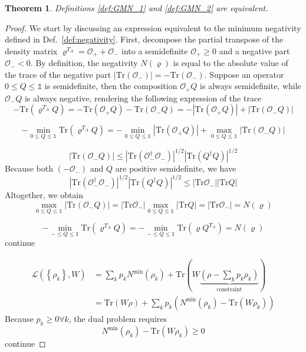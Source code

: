 \documentclass[12font]{article}
\newtheorem{theorem}{Theorem}[section]
\theoremstyle{definition}
\newcommand{\lr}[1]{\left(  #1  \right)}
\newcommand{\lrg}[1]{\left\{  #1  \right\}}
\newcommand{\abs}[1]{\left|  #1  \right|}
\newcommand{\mrm}[1]{\mathrm{#1}}
\newcommand{\alert}[1]{{\color{red}#1}}
\newcommand{\Tr}{\mrm{Tr}}
\begin{document}
\begin{theorem}
    Definitions \ref{def:GMN_1} and \ref{def:GMN_2} are equivalent.
\end{theorem}
\begin{proof}
    We start by discussing an expression equivalent to the minimum negativity defined in Def.~\ref{def:negativity}. First, decompose the partial transpose of the density matrix $\varrho^{T_A} = \mathcal{O}_+ + \mathcal{O}_-$ into a semidefinite $\mathcal{O}_+ \geq 0$ and a negative part $\mathcal{O}_- < 0$. By definition, the negativity $N(\varrho)$ is equal to the absolute value of the trace of the negative part $\abs{\Tr\lr{\mathcal{O}_-}} = -\Tr\lr{\mathcal{O}_-}$. Suppose an operator $0 \leq Q \leq \mathds{1}$ is semidefinite, then the composition $\mathcal{O}_+ Q$ is always semidefinite, while $\mathcal{O}_-Q$ is always negative, rendering the following expression of the trace
    \[
    -\Tr\lr{\varrho^{T_A} Q} 
    = 
    -\Tr\lr{\mathcal{O}_+ Q} 
    - 
    \Tr\lr{\mathcal{O}_- Q}
    =
    -\abs{\Tr\lr{\mathcal{O}_+ Q}}
    +
    \abs{\Tr\lr{\mathcal{O}_- Q}}
    \]

    \[
    - \min_{0\leq Q \leq\mathds{1}} \Tr\lr{\varrho^{T_A} Q}
    =
    - \min_{0\leq Q \leq\mathds{1}} \abs{\Tr\lr{\mathcal{O}_+ Q}}
    +
    \max_{0\leq Q \leq\mathds{1}} \abs{\Tr\lr{\mathcal{O}_- Q}}
    \]

    \[
    \abs{\Tr\lr{\mathcal{O}_- Q}} 
    \leq 
    \abs{\Tr\lr{\mathcal{O}_-^\dagger\mathcal{O}_-}}^{1/2} 
    \abs{\Tr \lr{Q^\dagger Q}}^{1/2}
    \]
    Because both $(-\mathcal{O}_-)$ and $Q$ are positive semidefinite, we have
    \[
    \abs{\Tr\lr{\mathcal{O}_-^\dagger\mathcal{O}_-}}^{1/2}  \abs{\Tr \lr{Q^\dagger Q}}^{1/2}
    \leq
    \abs{\Tr \mathcal{O_-}} \abs{\Tr Q}
    \]
    Altogether, we obtain
    \[
    \max_{0\leq Q \leq\mathds{1}} \abs{\Tr\lr{\mathcal{O}_- Q}}
    =
    \abs{\Tr\mathcal{O}_-} \max_{0\leq Q \leq\mathds{1}} \abs{\Tr Q}
    =
    \abs{\Tr\mathcal{O}_-}
    =
    N(\varrho)
    \]

    \[
    -\min_{-\leq Q\leq\mathds{1}}\Tr\lr{\varrho^{T_A} Q} = -\min_{-\leq Q\leq\mathds{1}}\Tr\lr{\varrho Q^{T_A}} = N(\varrho)
    \]
    \alert{continue}
    
    \begin{align*}
        \mathcal{L}(\lrg{\rho_k}, W) &= \sum_k p_k N^{\min}(\rho_k) + \mrm{Tr}
        \lr{
        W \underbrace{\lr{\rho - \sum_k p_k \rho_k}}_{\text{constraint}} 
        } \\
        &= \mrm{Tr}\lr{W\rho} + \sum_k p_k \lr{N^{\min}(\rho_k) - \mrm{Tr}\lr{W\rho_k}}
    \end{align*}
    Because $p_k\geq 0 \forall k$, the dual problem requires
    \[
    N^{\min}(\rho_k) - \mrm{Tr}\lr{W\rho_k} \geq 0
    \]
    \alert{continue}
\end{proof}
\end{document}
